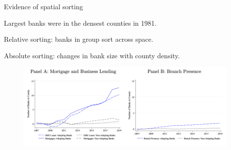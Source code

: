 \documentclass[notes,10pt, aspectratio=169]{beamer}
\newenvironment{wideitemize}{\itemize\addtolength{\itemsep}{10pt}}{\enditemize}
\begin{document}
\begin{frame}{Evidence of spatial sorting}


    \begin{wideitemize}
        \item Largest banks were in the densest counties in 1981.
        \item Relative sorting: banks in group sort across space.
        \item Absolute sorting: changes in bank size with county density.
\end{wideitemize}

\begin{figure}
\centering
\includegraphics[width=0.99\textwidth]{imgs/fig5.png}
\label{fig:my_label}
\end{figure}

\end{frame}
\end{document}
